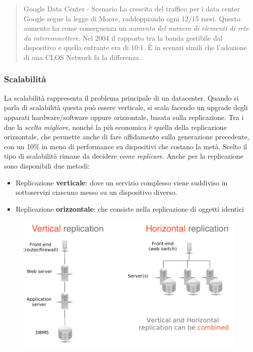 \documentclass{article}
\providecommand{\tightlist}{%
		  \setlength{\itemsep}{0pt}\setlength{\parskip}{0pt}}
\begin{document}
		\begin{quote}
		Google Data Center - Scenario La crescita del traffico per i
		data center Google segue la legge di Moore, raddoppiando ogni
		12/15 mesi. Questo aumento ha come conseguenza un \emph{aumento del
		numero di elementi di rete da interconnettere}. Nel 2004 il rapporto tra
		la banda gestibile dal dispositivo e quella entrante era di 10:1.
		È in scenari simili che l'adozione di una CLOS Network fa la
		differenza.
		\end{quote}
		
		\subsubsection{Scalabilità}\label{scalabilituxe0}
		
		La scalabilità rappresenta il problema principale di un datacenter. Quando si parla di scalabilità questa può essere verticale, si scala facendo un upgrade degli apparati hardware/software oppure orizzontale, basata sulla replicazione. Tra i due la \emph{scelta	migliore}, nonché la più economica è quella della replicazione orizzontale, che permette anche di fare affidamento sulla generazione precedente, con un 10\% in meno di performance su dispositivi che costano la metà. Scelto il tipo di scalabilità rimane da decidere \emph{come	replicare}. Anche per la replicazione sono disponibili	due metodi:
		
		\begin{itemize}
		\tightlist
		\item
		  Replicazione \textbf{verticale}: dove un servizio complesso
		  viene suddiviso in sottoservizi ciascuno messo su un
		  dispositivo diverso.
		\item
		  Replicazione \textbf{orizzontale}: che consiste nella
		  replicazione di oggetti identici
		\end{itemize}
		
		\begin{figure}[ht]
			\centering
			\includegraphics[width=0.5\linewidth]{images/SAC_B7_replication}
		\end{figure}
		
\end{document}
